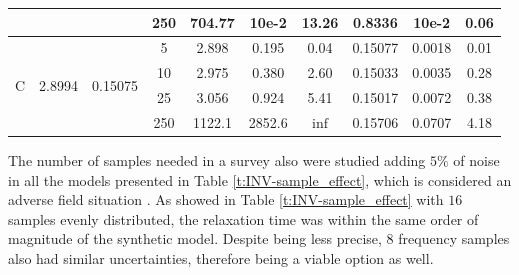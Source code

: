 \documentclass{vie16}
\begin{document}
\begin{table}[H]
\begin{adjustbox}{scale=0.8}
\begin{tabular}{|c|cc|c|ccc|ccc|}
 &  &  & 250 & 704.77  & 10e-2  &  13.26  & 0.8336 & 10e-2  & 0.06 \\ \hline
\multirow{4}{*}{C} & \multirow{4}{*}{2.8994} & \multirow{4}{*}{0.15075} 
				& 5 & 2.898 & 0.195 & 0.04    & 0.15077 & 0.0018 &
				0.01  \\
 &  &  & 10 & 2.975 & 0.380 & 2.60 & 0.15033 & 0.0035 & 0.28 \\
 &  &  & 25 & 3.056 & 0.924 & 5.41   & 0.15017 & 0.0072  &
 0.38 \\
 &  &  & 250 & 1122.1 &  2852.6 & $\inf$  & 0.15706 & 0.0707
 & 4.18  \\ \hline
\end{tabular}
\end{adjustbox}
\end{table}

The number of samples needed in a survey also were studied adding $5\%$
of noise in all the models presented in Table
\ref{t:INV-sample_effect}, which is considered an adverse field situation
\citet{sandor11}. As showed in Table \ref{t:INV-sample_effect} with
$16$ samples evenly distributed, the relaxation time was within the
same order of magnitude of the synthetic model. Despite being less
precise, $8$ frequency samples also had similar uncertainties, therefore
being a viable option as well.
\end{document}
